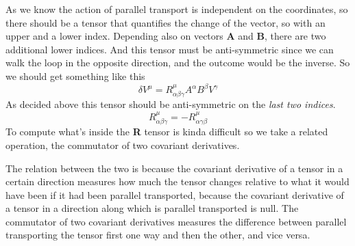 \bigskip

As we know the action of parallel transport is independent on the coordinates, so there should be a tensor that quantifies the change of the vector, so with an upper and a lower index. Depending also on vectors \textbf{A} and \textbf{B}, there are two additional lower indices. And this tensor must be anti-symmetric since we can walk the loop in the opposite direction, and the outcome would be the inverse. So we should get something like this
\begin{equation}
\delta V^{\mu } = R^{\mu }_{\alpha \beta \gamma }A^{\alpha }B^{\beta }V^{\gamma}
\end{equation}
As decided above this tensor should be anti-symmetric on the \emph{last two indices}.
\[
R^{\mu }_{\alpha \beta \gamma } = - R^{\mu }_{\alpha \gamma  \beta }
\]
To compute what's inside the \textbf{R} tensor is kinda difficult so we take a related operation, the commutator of two covariant derivatives. \par
The relation between the two is because the covariant derivative of a tensor in a certain direction measures how much the tensor changes relative to what it would have been if it had been parallel transported, because the covariant derivative of a tensor in a direction along which is parallel transported is null. The commutator of two covariant derivatives measures the difference between parallel transporting the tensor first one way and then the other, and vice versa.\bigskip

\begin{center}
\end{center}
\bigskip

